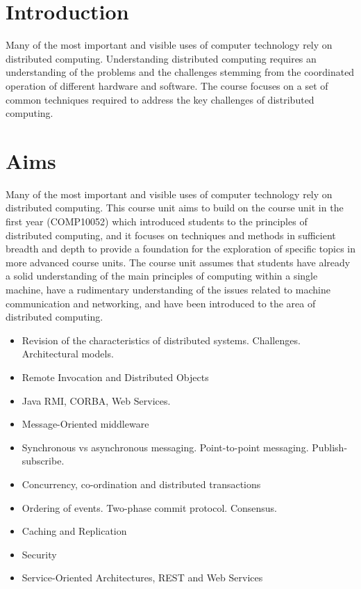 \section*{Introduction}

Many of the most important and visible uses of computer technology rely on
distributed computing. Understanding distributed computing requires an
understanding of the problems and the challenges stemming from the coordinated
operation of different hardware and software. The course focuses on a set of
common techniques required to address the key challenges of distributed
computing.

\section*{Aims}

Many of the most important and visible uses of computer technology rely on distributed computing. This course unit aims to build on the course unit in the first year (COMP10052) which introduced students to the principles of distributed computing, and it focuses on techniques and methods in sufficient breadth and depth to provide a foundation for the exploration of specific topics in more advanced course units. The course unit assumes that students have already a solid understanding of the main principles of computing within a single machine, have a rudimentary understanding of the issues related to machine communication and networking, and have been introduced to the area of distributed computing.

\begin{itemize}
  \item Revision of the characteristics of distributed systems. Challenges. Architectural models.
  \item Remote Invocation and Distributed Objects
  \item Java RMI, CORBA, Web Services.
  \item Message-Oriented middleware
  \item Synchronous vs asynchronous messaging. Point-to-point messaging. Publish-subscribe.
  \item Concurrency, co-ordination and distributed transactions
  \item Ordering of events. Two-phase commit protocol. Consensus.
  \item Caching and Replication
  \item Security
  \item Service-Oriented Architectures, REST and Web Services
\end{itemize}


